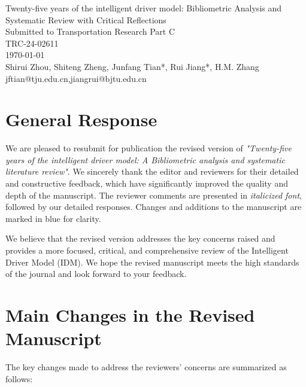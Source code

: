 \documentclass[a4paper,fleqn,11pt]{reviewresponse}
\makeatletter
\newcommand{\myAuthors}{Shirui Zhou, Shiteng Zheng,  Junfang Tian*, Rui Jiang*, H.M. Zhang}
\newcommand{\myEmail}{jftian@tju.edu.cn,jiangrui@bjtu.edu.cn}
\newcommand{\myTitle}{Twenty-five years of the intelligent driver model: Bibliometric Analysis and Systematic Review with Critical Reflections}
\newcommand{\myJournal}{Submitted to Transportation Research Part C}
\newcommand{\myDoi}{TRC-24-02611}
\makeatother
\begin{document}
\thispagestyle{plain}

\begin{center}
 {\LARGE\myTitle} \vspace{0.5cm} \\
 {\large\myJournal} \vspace{0.5cm} \\
 {\large\myDoi} \vspace{0.5cm} \\
 \today \vspace{0.5cm} \\
 \myAuthors \vspace{0.5cm}\\
\myEmail \vspace{1cm} \\
\end{center}

\section*{General Response}

We are pleased to resubmit for publication the revised version of \textit{"Twenty-five years of the intelligent driver model: A Bibliometric analysis and systematic literature review"}. We sincerely thank the editor and reviewers for their detailed and constructive feedback, which have significantly improved the quality and depth of the manuscript. The reviewer comments are presented in \textit{italicized font}, followed by our detailed responses. Changes and additions to the manuscript are marked in {\color{customblue}blue} for clarity.

We believe that the revised version addresses the key concerns raised and provides a more focused, critical, and comprehensive review of the Intelligent Driver Model (IDM). We hope the revised manuscript meets the high standards of the journal and look forward to your feedback.

\section*{Main Changes in the Revised Manuscript}

The key changes made to address the reviewers’ concerns are summarized as follows:
\end{document}
